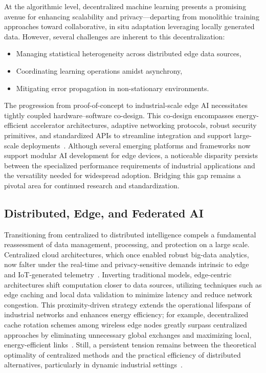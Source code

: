 \documentclass[sigconf]{acmart}
\begin{document}
At the algorithmic level, decentralized machine learning presents a promising avenue for enhancing scalability and privacy—departing from monolithic training approaches toward collaborative, in situ adaptation leveraging locally generated data. However, several challenges are inherent to this decentralization:
\begin{itemize}
    \item Managing statistical heterogeneity across distributed edge data sources,
    \item Coordinating learning operations amidst asynchrony,
    \item Mitigating error propagation in non-stationary environments.
\end{itemize}

The progression from proof-of-concept to industrial-scale edge AI necessitates tightly coupled hardware–software co-design. This co-design encompasses energy-efficient accelerator architectures, adaptive networking protocols, robust security primitives, and standardized APIs to streamline integration and support large-scale deployments~\cite{ref49}. Although several emerging platforms and frameworks now support modular AI development for edge devices, a noticeable disparity persists between the specialized performance requirements of industrial applications and the versatility needed for widespread adoption. Bridging this gap remains a pivotal area for continued research and standardization.

\subsection{Distributed, Edge, and Federated AI}

Transitioning from centralized to distributed intelligence compels a fundamental reassessment of data management, processing, and protection on a large scale. Centralized cloud architectures, which once enabled robust big-data analytics, now falter under the real-time and privacy-sensitive demands intrinsic to edge and IoT-generated telemetry~\cite{ref10,ref11}. Inverting traditional models, edge-centric architectures shift computation closer to data sources, utilizing techniques such as edge caching and local data validation to minimize latency and reduce network congestion. This proximity-driven strategy extends the operational lifespans of industrial networks and enhances energy efficiency; for example, decentralized cache rotation schemes among wireless edge nodes greatly surpass centralized approaches by eliminating unnecessary global exchanges and maximizing local, energy-efficient links~\cite{ref11}. Still, a persistent tension remains between the theoretical optimality of centralized methods and the practical efficiency of distributed alternatives, particularly in dynamic industrial settings~\cite{ref10,ref11}.
\end{document}
